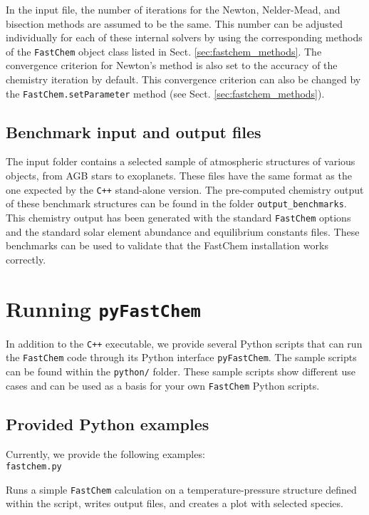 \documentclass[numbers=noenddot]{aux/fcmanual}
\newcommand{\fc}{\texttt{FastChem}\xspace}
\newcommand{\pfc}{\texttt{pyFastChem}\xspace}
\newcommand{\cpp}{\ttt{C++}\xspace}
\newcommand{\ttt}[1]{\texttt {#1}}
\begin{document}
In the input file, the number of iterations for the Newton, Nelder-Mead, and bisection methods are assumed to be the same. This number can be adjusted individually for each of these internal solvers by using the corresponding methods of the \fc object class listed in Sect. \ref{sec:fastchem_methods}. The convergence criterion for Newton's method is also set to the accuracy of the chemistry iteration by default. This convergence criterion can also be changed by the \lstinline!FastChem.setParameter! method (see Sect. \ref{sec:fastchem_methods}).


\section{Benchmark input and output files}

The input folder contains a selected sample of atmospheric structures of various objects, from AGB stars to exoplanets. These files have the same format as the one expected by the \cpp stand-alone version. The pre-computed chemistry output of these benchmark structures can be found in the folder \texttt{output\_benchmarks}. This chemistry output has been generated with the standard \fc options and the standard solar element abundance and equilibrium constants files. These benchmarks can be used to validate that the FastChem installation works correctly.


\chapter{Running \pfc}

In addition to the \cpp executable, we provide several Python scripts that can run the \fc code through its Python interface \pfc. The sample scripts can be found within the \verb|python/| folder. These sample scripts show different use cases and can be used as a basis for your own \fc Python scripts.

\section{Provided Python examples}
\label{sec:pyfc_examples}
Currently, we provide the following examples:\\

\lstinline!fastchem.py!
\begin{addmargin}[25pt]{0pt}
  Runs a simple \fc calculation on a temperature-pressure structure defined within the script, writes output files, and creates a plot with selected species.\\
\end{addmargin}
\end{document}
